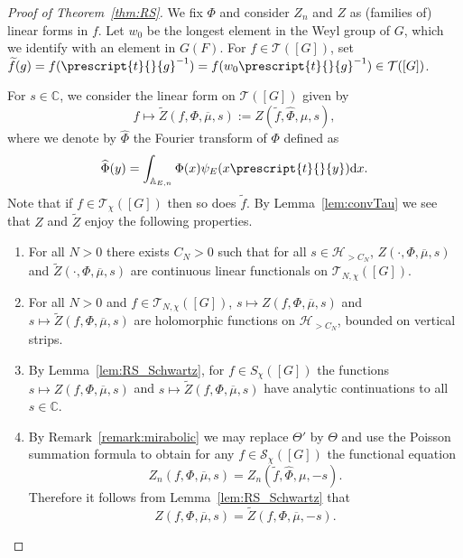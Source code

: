 \documentclass[letterpaper,11pt]{amsart}
\newcommand{\bA}{\mathbb{A}}
\newcommand{\C}{\mathbb{C}}
\newcommand{\cS}{\mathcal{S}}
\newcommand{\cT}{\mathcal{T}}
\newcommand{\rd}{\mathrm{d}}
\newcommand{\<}{\negthickspace}
\newcommand{\tp}[1]{\prescript{t}{}{#1}}
\theoremstyle{definition}
\theoremstyle{plain}
\theoremstyle{remark}
\numberwithin{equation}{section}
\begin{document}
\begin{proof}[Proof of Theorem~\ref{thm:RS}]
We fix $\Phi$ and consider $Z_n$ and
$Z$ as (families of) linear forms in $f$. Let $w_0$ be the longest element in the Weyl group of $G$, which we identify with an element in $G(F)$. For $f \in \cT([G])$, set
$\widetilde{f}(g) = f(\tp{g}^{-1}) = f(w_0 \tp{g}^{-1}) \in \cT([G])$.

For $s \in \C$, we consider the linear form on $\cT([G])$ given by
    \begin{equation}
    \label{eq:Z_tilde_defi}
         f \mapsto \widetilde{Z}(f, \Phi, \overline{\mu}, s)
    := Z(\widetilde{f}, \widehat{\Phi}, \mu ,s), 
    \end{equation}
where we denote by $\widehat{\Phi}$ the Fourier transform of $\Phi$ defined as  
    \[
    \widehat{\Phi}(y) = \int_{\bA_{E, n}}
    \Phi(x) \psi_E(x \tp{y}) \rd x.
    \]
Note that if $f \in \cT_{\chi}([G])$ then so does $\widetilde{f}$. By
Lemma~\ref{lem:convTau} we see that $Z$ and
$\widetilde{Z}$ enjoy the following properties.
\begin{enumerate}
    \item For all $N>0$ there exists $C_N>0$ such that for all $s \in
        \mathcal{H}_{> C_N}$, $Z(\cdot, \Phi, \overline{\mu}, s)$
        and $\widetilde{Z}(\cdot, \Phi, \overline{\mu}, s)$ are
        continuous linear functionals on $\mathcal{T}_{N,\chi}([G])$.

    \item For all $N>0$ and $f \in \mathcal{T}_{N,\chi}([G])$, $s \mapsto
        Z(f,\Phi, \overline{\mu}, s)$ and $s \mapsto
        \widetilde{Z}(f,\Phi, \overline{\mu}, s)$ are holomorphic
        functions on $\mathcal{H}_{>C_N}$, bounded on vertical strips.

    \item By Lemma~\ref{lem:RS_Schwartz}, for $f \in
        S_\chi([G])$ the functions $s \mapsto Z(f,
        \Phi, \overline{\mu}, s)$ and $s \mapsto \widetilde{Z}(f,
        \Phi, \overline{\mu}, s)$ have analytic continuations to all $s \in \C$.

    \item By Remark~\ref{remark:mirabolic} we may replace $\Theta'$ by
        $\Theta$ and use the Poisson summation formula to obtain for any $f \in \cS_\chi([G])$ the functional equation 
            \[
            Z_n(f, \Phi, \overline{\mu}, s) =
            Z_n(\widetilde{f}, \widehat{\Phi}, \mu, -s).
            \]
        Therefore it follows from Lemma~\ref{lem:RS_Schwartz} that
           \begin{equation}
           \label{eq:functional_equation_Z}
                Z(f,\Phi, \overline{\mu}, s) =
            \widetilde{Z}(f, \Phi, \overline{\mu}, -s).
           \end{equation}
\end{enumerate}


\end{proof}
\end{document}
